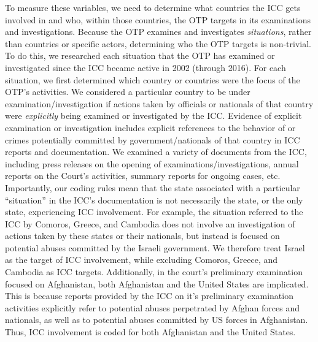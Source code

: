 To measure these variables, we need to determine what countries the ICC gets involved in and who, within those countries, the OTP targets in its examinations and investigations. Because the OTP examines and investigates \textit{situations}, rather than countries or specific actors, determining who the OTP targets is non-trivial. To do this, we researched each situation that the OTP has examined or investigated since the ICC became active in 2002 (through 2016). For each situation, we first determined which country or countries were the focus of the OTP's activities. We considered a particular country to be under examination/investigation if actions taken by officials or nationals of that country were \textit{explicitly} being examined or investigated by the ICC. Evidence of explicit examination or investigation includes explicit references to the behavior of or crimes potentially committed by government/nationals of that country in ICC reports and documentation. We examined a variety of documents from the ICC, including press releases on the opening of examinations/investigations, annual reports on the Court's activities, summary reports for ongoing cases, etc. Importantly, our coding rules mean that the state associated with a particular ``situation'' in the ICC's documentation is not necessarily the state, or the only state, experiencing ICC involvement. For example, the situation referred to the ICC by Comoros, Greece, and Cambodia does not involve an investigation of actions taken by these states or their nationals, but instead is focused on potential abuses committed by the Israeli government. We therefore treat Israel as the target of ICC involvement, while excluding Comoros, Greece, and Cambodia as ICC targets. Additionally, in the court's preliminary examination focused on Afghanistan, both Afghanistan and the United States are implicated. This is because reports provided by the ICC on it's preliminary examination activities explicitly refer to potential abuses perpetrated by Afghan forces and nationals, as well as to potential abuses committed by US forces in Afghanistan. Thus, ICC involvement is coded for both Afghanistan and the United States.

